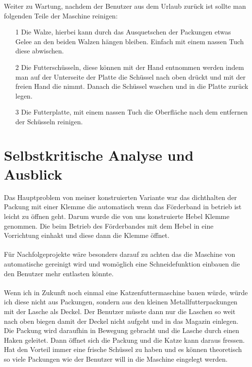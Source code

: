 Weiter zu Wartung, nachdem der Benutzer aus dem Urlaub zurück ist sollte man folgenden Teile der Maschine reinigen: 

\begin{itemize}
\item[1] Die Walze, hierbei kann durch das Ausquetschen der Packungen etwas Gelee an den beiden Walzen hängen bleiben. Einfach mit einem nassen Tuch diese abwischen.
\item[2] Die Futterschüsseln, diese können mit der Hand entnommen werden indem man auf der Unterseite der Platte die Schüssel nach oben drückt und mit der freien Hand die nimmt. Danach die Schüssel waschen und in die Platte zurück legen.
\item[3] Die Futterplatte, mit einem nassen Tuch die Oberfläche nach dem entfernen der Schüsseln reinigen.
\end{itemize}


\section{Selbstkritische Analyse und Ausblick}

Das Hauptproblem von meiner konstruierten Variante war das dichthalten der Packung mit einer Klemme die automatisch wenn das Förderband in betrieb ist leicht zu öffnen geht. Darum wurde die von uns konstruierte Hebel Klemme genommen. Die beim Betrieb des Förderbandes mit dem Hebel in eine Vorrichtung einhakt und diese dann die Klemme öffnet. \\
\\
Für Nachfolgeprojekte wäre besonders darauf zu achten das die Maschine von automatische gereinigt wird und womöglich eine Schneidefunktion einbauen die den Benutzer mehr entlasten könnte.\\
\\
Wenn ich in Zukunft noch einmal eine Katzenfuttermaschine bauen würde, würde ich diese nicht aus Packungen, sondern aus den kleinen Metallfutterpackungen mit der Lasche als Deckel. Der Benutzer müsste dann nur die Laschen so weit nach oben biegen damit der Deckel nicht aufgeht und in das Magazin einlegen. Die Packung wird daraufhin in Bewegung gebracht und die Lasche durch einen Haken geleitet. Dann öffnet sich die Packung und die Katze kann daraus fressen. Hat den Vorteil immer eine frische Schüssel zu haben und es können theoretisch so viele Packungen wie der Benutzer will in die Maschine eingelegt werden. \\
 
